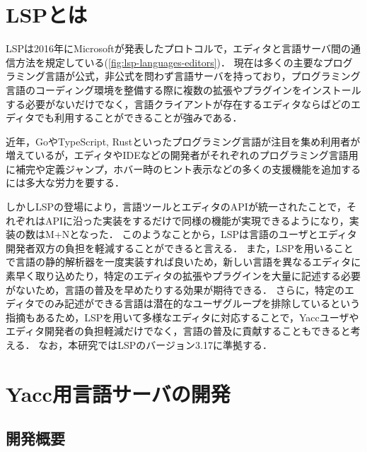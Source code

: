 \documentclass[fontsize=9bp,twocolumn,column_gap=2.36zw,a4paper,report]{jlreq}
\begin{document}
\chapter{LSPとは}

LSPは2016年にMicrosoftが発表したプロトコルで，エディタと言語サーバ間の通信方法を規定している(\ref{fig:lsp-languages-editors})．
現在は多くの主要なプログラミング言語が公式，非公式を問わず言語サーバを持っており\cite{lsp_impl}，プログラミング言語のコーディング環境を整備する際に複数の拡張やプラグインをインストールする必要がないだけでなく，言語クライアントが存在するエディタならばどのエディタでも利用することができることが強みである．\par
近年，GoやTypeScript, Rustといったプログラミング言語が注目を集め利用者が増えているが，エディタやIDEなどの開発者がそれぞれのプログラミング言語用に補完や定義ジャンプ，ホバー時のヒント表示などの多くの支援機能を追加するには多大な労力を要する．
\begin{figure}[h]
\end{figure}

しかしLSPの登場により，言語ツールとエディタのAPIが統一されたことで，それぞれはAPIに沿った実装をするだけで同様の機能が実現できるようになり，実装の数はM+Nとなった．
このようなことから，LSPは言語のユーザとエディタ開発者双方の負担を軽減することができると言える．
また，LSPを用いることで言語の静的解析器を一度実装すれば良いため，新しい言語を異なるエディタに素早く取り込めたり，特定のエディタの拡張やプラグインを大量に記述する必要がないため，言語の普及を早めたりする効果が期待できる．
さらに，特定のエディタでのみ記述ができる言語は潜在的なユーザグループを排除しているという指摘\cite{bunder2019decoupling}もあるため，LSPを用いて多様なエディタに対応することで，Yaccユーザやエディタ開発者の負担軽減だけでなく，言語の普及に貢献することもできると考える．
なお，本研究ではLSPのバージョン3.17に準拠する．
\newline

\chapter{Yacc用言語サーバの開発}
\section{開発概要}
\end{document}
